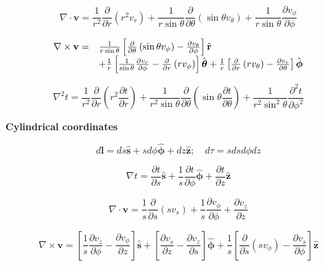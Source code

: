 \documentclass[11pt]{article}
\begin{document}
\[
\nabla \cdot \mathbf { v } = \frac { 1 } { r ^ { 2 } } \frac { \partial } { \partial r } \left( r ^ { 2 } v _ { r } \right) + \frac { 1 } { r \sin \theta } \frac { \partial } { \partial \theta } \left( \sin \theta v _ { \theta } \right) + \frac { 1 } { r \sin \theta } \frac { \partial v _ { \phi } } { \partial \phi }
\]


\[
\begin{array} { r l } { \nabla \times \mathbf { v } = } & { \frac { 1 } { r \sin \theta } \left[ \frac { \partial } { \partial \theta } \left( \sin \theta v _ { \phi } \right) - \frac { \partial v _ { \theta } } { \partial \phi } \right] \hat { \mathbf { r } } } \\ { } & { + \frac { 1 } { r } \left[ \frac { 1 } { \sin \theta } \frac { \partial v _ { r } } { \partial \phi } - \frac { \partial } { \partial r } \left( r v _ { \phi } \right) \right] \hat { \boldsymbol { \theta } } + \frac { 1 } { r } \left[ \frac { \partial } { \partial r } \left( r v _ { \theta } \right) - \frac { \partial v _ { r } } { \partial \theta } \right] \hat { \boldsymbol { \phi } } } \end{array}
\]


\[
\nabla ^ { 2 } t = \frac { 1 } { r ^ { 2 } } \frac { \partial } { \partial r } \left( r ^ { 2 } \frac { \partial t } { \partial r } \right) + \frac { 1 } { r ^ { 2 } \sin \theta } \frac { \partial } { \partial \theta } \left( \sin \theta \frac { \partial t } { \partial \theta } \right) + \frac { 1 } { r ^ { 2 } \sin ^ { 2 } \theta } \frac { \partial ^ { 2 } t } { \partial \phi ^ { 2 } }
\]



{\bf Cylindrical coordinates}

\[
d \mathbf { l } = d s \hat { \mathbf { s } } + s d \phi \hat { \boldsymbol { \phi } } + d z \hat { \mathbf { z } } ; \quad d \tau = s d s d \phi d z
\]


\[
\nabla t = \frac { \partial t } { \partial s } \hat { \mathbf { s } } + \frac { 1 } { s } \frac { \partial t } { \partial \phi } \hat { \boldsymbol { \phi } } + \frac { \partial t } { \partial z } \mathbf { \hat { z } }
\]


\[
\nabla \cdot \mathbf { v } = \frac { 1 } { s } \frac { \partial } { \partial s } \left( s v _ { s } \right) + \frac { 1 } { s } \frac { \partial v _ { \phi } } { \partial \phi } + \frac { \partial v _ { z } } { \partial z }
\]


\[
\nabla \times \mathbf { v } = \left[ \frac { 1 } { s } \frac { \partial v _ { z } } { \partial \phi } - \frac { \partial v _ { \phi } } { \partial z } \right] \hat { \mathbf { s } } + \left[ \frac { \partial v _ { s } } { \partial z } - \frac { \partial v _ { z } } { \partial s } \right] \hat { \boldsymbol { \phi } } + \frac { 1 } { s } \left[ \frac { \partial } { \partial s } \left( s v _ { \phi } \right) - \frac { \partial v _ { s } } { \partial \phi } \right] \hat { \mathbf { z } }
\]
\end{document}
